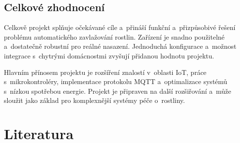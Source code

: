 \documentclass[a4paper, 11pt]{article}
\begin{document}
\subsection{Celkové zhodnocení}

Celkově projekt splňuje očekávané cíle a~přináší funkční a~přizpůsobivé řešení problému automatického zavlažování rostlin. Zařízení je snadno použitelné 
a~dostatečně robustní pro reálné nasazení. Jednoduchá konfigurace a~možnost integrace s~chytrými domácnostmi zvyšují přidanou hodnotu projektu.

Hlavním přínosem projektu je rozšíření znalostí v~oblasti IoT, práce s~mikrokontroléry, implementace protokolu MQTT a~optimalizace systémů s~nízkou spotřebou energie. 
Projekt je připraven na další rozšiřování a~může sloužit jako základ pro komplexnější systémy péče o~rostliny.

\newpage
\section{Literatura}


\end{document}
